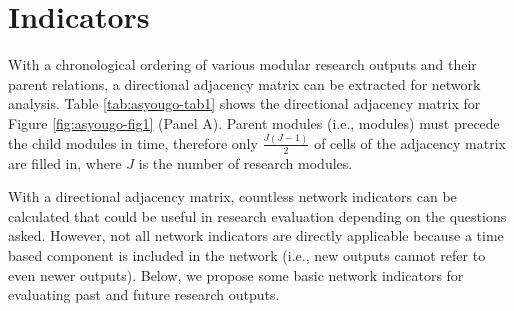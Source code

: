 \documentclass[a5paper]{book}
\begin{document}
\section{Indicators}\label{indicators}

With a chronological ordering of various modular research outputs and
their parent relations, a directional adjacency matrix can be extracted
for network analysis. Table \ref{tab:asyougo-tab1} shows the directional
adjacency matrix for Figure \ref{fig:asyougo-fig1} (Panel A). Parent
modules (i.e., modules) must precede the child modules in time,
therefore only \(\frac{J(J-1)}{2}\) of cells of the adjacency matrix are
filled in, where \(J\) is the number of research modules.

\begin{table}[!h]

\caption{\label{tab:asyougo-tab1}Directional adjacency matrix for Figure 1. modules are ordered according to time (top-bottom in Figure 1). Rows indicate the source module, columns indicate the target module.}
\centering
{}
\end{table}

With a directional adjacency matrix, countless network indicators can be
calculated that could be useful in research evaluation depending on the
questions asked. However, not all network indicators are directly
applicable because a time based component is included in the network
(i.e., new outputs cannot refer to even newer outputs). Below, we
propose some basic network indicators for evaluating past and future
research outputs.
\end{document}
